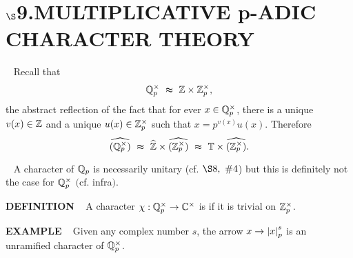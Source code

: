 \chapter{
$\boldsymbol{\S}$\textbf{9}.\quad  MULTIPLICATIVE p-ADIC CHARACTER THEORY}
\setlength\parindent{2em}
\setcounter{theoremn}{0}

\ \indent 
Recall that
\[
\mathbb{Q}_p^\times \ \thickapprox \  \mathbb{Z} \times \mathbb{Z}_p^\times,
\]
the abstract reflection of the fact that for ever $x \in \mathbb{Q}_p^\times$, there is a unique $v(x) \in \mathbb{Z}$ and a unique $u(x) \in \mathbb{Z}_p^\times$ such that $x = p^{v(x)}u(x)$.  
Therefore
\[
\widehat{(\Q_p^\times)} \ 
\thickapprox \ \widehat{\Z} \times \widehat{(\Z_p^\times)}  \ 
\thickapprox \ \T \times \widehat{(\Z_p^\times)}.
\]

\vspace{0.1cm}

\begin{x}{\small\bf {}} \ %
A character of $\mathbb{Q}_p$ is necessarily unitary (cf. $ \S8, \  \# 4$) but this is definitely not the case for $\mathbb{Q}_p^\times$ $($cf. infra$)$.
\end{x}

\vspace{0.1cm}

\begin{x}{\small\bf DEFINITION} \ %
A character $\chi: \mathbb{Q}_p^\times \rightarrow \mathbb{C}^\times$ is  if it is trivial on $\mathbb{Z}_p^\times$.
\end{x}

\vspace{0.1cm}

\begin{x}{\small\bf EXAMPLE} \ %
Given any complex number $s$, the arrow $x \rightarrow \left\vert x\right\vert_p^s$ is an unramified character of $\mathbb{Q}_p^\times$.
\end{x}

\vspace{0.1cm}

